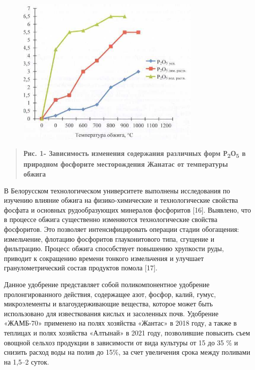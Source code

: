 \begin{figure}[H]
	\centering
	\includegraphics[width=0.8\textwidth]{assets/1082}
	\caption*{}
\end{figure}

\begin{quote}
\textbf{Рис. 1- Зависимость изменения содержания различных форм
Р\textsubscript{2}О\textsubscript{5} в природном фосфорите месторождения
Жанатас от температуры обжига}
\end{quote}

В Белорусском технологическом университете выполнены исследования по
изучению влияние обжига на физико-химические и технологические свойства
фосфата и основных рудообразующих минералов фосфоритов {[}16{]}.
Выявлено, что в процессе обжига существенно изменяются технологические
свойства фосфоритов. Это позволяет интенсифицировать операции стадии
обогащения: измельчение, флотацию фосфоритов глауконитового типа,
сгущение и фильтрацию. Процесс обжига способствует повышению хрупкости
руды, приводит к сокращению времени тонкого измельчения и улучшает
гранулометрический состав продуктов помола {[}17{]}.

Данное удобрение представляет собой поликомпонентное удобрение
пролонгированного действия, содержащее азот, фосфор, калий, гумус,
микроэлементы и влагоудерживающие вещества, которое может быть
использовано для известкования кислых и засоленных почв. Удобрение
«ЖАМБ-70» применено на полях хозяйства «Жантас» в 2018 году, а также в
теплицах и полях хозяйства «Алтынай» в 2021 году, позволившие повысить
съем овощной сельхоз продукции в зависимости от вида культуры от 15 до
35 \% и снизить расход воды на полив до 15\%, за счет увеличения срока
между поливами на 1,5--2 суток.

